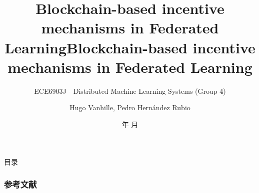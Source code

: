 \documentclass[xcolor=table,dvipsnames,svgnames,aspectratio=169]{ctexbeamer}
\author{Hugo Vanhille, Pedro Hernández Rubio}
\institute[SEIEE]{Department of Automation}
\date{\the\year 年 \the\month 月}
\title{Blockchain-based incentive mechanisms in Federated Learning}
\title[Research project proposal (Group 4)] %
{\textbf{Blockchain-based incentive mechanisms in Federated Learning}} %
\subtitle{ECE6903J - Distributed Machine Learning Systems (Group 4)}
\begin{document}
\AtBeginSection[]{
  \begin{frame}
    \sectionpage                   %
  \end{frame}
}

\AtBeginSubsection[]{                  %
  \begin{frame}
    \subsectionpage                %
  \end{frame}
}

\maketitle

\begin{frame}{目录}
\begin{multicols}{2}
  \tableofcontents
  \end{multicols}
\end{frame}



%





\appendix

\begin{frame}[allowframebreaks]
  \frametitle{参考文献}
  \printbibliography
\end{frame}

\makebottom
\end{document}
